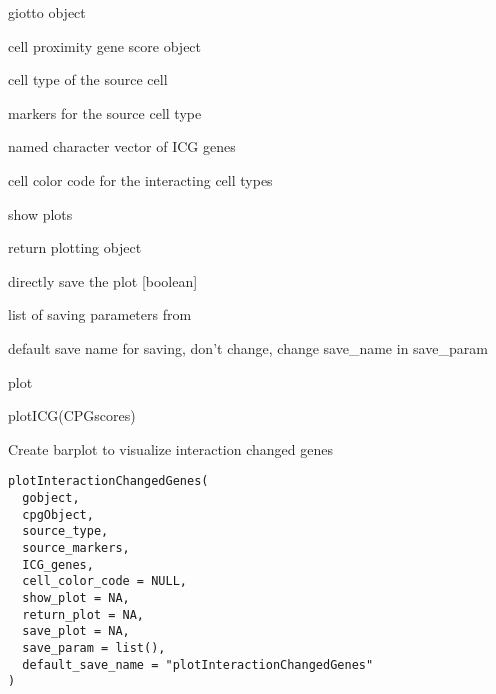 \documentclass[a4paper]{book}
\begin{document}
%
\begin{Arguments}
\begin{ldescription}
\item[\code{gobject}] giotto object

\item[\code{cpgObject}] cell proximity gene score object

\item[\code{source\_type}] cell type of the source cell

\item[\code{source\_markers}] markers for the source cell type

\item[\code{ICG\_genes}] named character vector of ICG genes

\item[\code{cell\_color\_code}] cell color code for the interacting cell types

\item[\code{show\_plot}] show plots

\item[\code{return\_plot}] return plotting object

\item[\code{save\_plot}] directly save the plot [boolean]

\item[\code{save\_param}] list of saving parameters from 

\item[\code{default\_save\_name}] default save name for saving, don't change, change save\_name in save\_param
\end{ldescription}
\end{Arguments}
%
\begin{Value}
plot
\end{Value}
%
\begin{Examples}
\begin{ExampleCode}
    plotICG(CPGscores)
\end{ExampleCode}
\end{Examples}
%
\begin{Description}\relax
Create barplot to visualize interaction changed genes
\end{Description}
%
\begin{Usage}
\begin{verbatim}
plotInteractionChangedGenes(
  gobject,
  cpgObject,
  source_type,
  source_markers,
  ICG_genes,
  cell_color_code = NULL,
  show_plot = NA,
  return_plot = NA,
  save_plot = NA,
  save_param = list(),
  default_save_name = "plotInteractionChangedGenes"
)
\end{verbatim}
\end{Usage}
\end{document}
